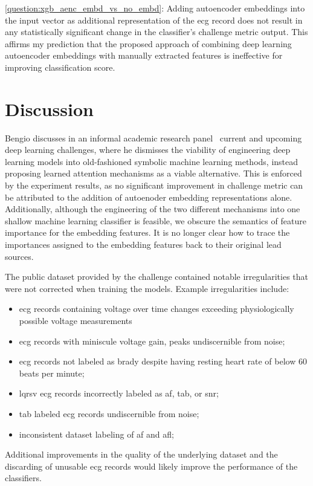 \documentclass[\main/thesis.tex]{subfiles}
\begin{document}
\ref{question:xgb_aenc_embd_vs_no_embd}: Adding autoencoder embeddings into the input vector as additional representation of the \gls{ecg} record does not result in any statistically significant change in the classifier's challenge metric output.
This affirms my prediction that the proposed approach of combining deep learning autoencoder embeddings with manually extracted features is ineffective for improving classification score.

\section{Discussion}

Bengio discusses in an informal academic research panel~\cite{2020-yoshua-dlc} current and upcoming deep learning challenges, where he dismisses the viability of engineering deep learning models into old-fashioned symbolic machine learning methods, instead proposing learned attention mechanisms as a viable alternative.
This is enforced by the experiment results, as no significant improvement in challenge metric can be attributed to the addition of autoenoder embedding representations alone.
Additionally, although the engineering of the two different mechanisms into one shallow machine learning classifier is feasible, we obscure the semantics of feature importance for the embedding features.
It is no longer clear how to trace the importances assigned to the embedding features back to their original lead sources.

The public dataset provided by the challenge contained notable irregularities that were not corrected when training the models.
Example irregularities include: 
\begin{itemize}
    \item \gls{ecg} records containing voltage over time changes exceeding physiologically possible voltage measurements
    \item \gls{ecg} records with miniscule voltage gain, peaks undiscernible from noise;
    \item \gls{ecg} records not labeled as \gls{brady} despite having resting heart rate of below 60 beats per minute;
    \item \gls{lqrsv} \gls{ecg} records incorrectly labeled as \gls{af}, \gls{tab}, or \gls{snr};
    \item \gls{tab} labeled \gls{ecg} records undiscernible from noise;
    \item inconsistent dataset labeling of \gls{af} and \gls{afl};
\end{itemize}
Additional improvements in the quality of the underlying dataset and the discarding of unusable \gls{ecg} records would likely improve the performance of the classifiers.
\end{document}
